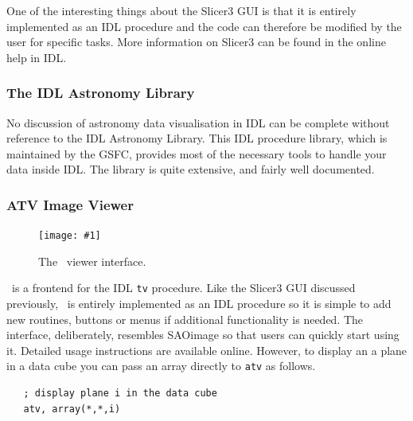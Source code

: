 \documentclass[twoside,11pt]{article}
\newcommand{\htmladdnormallink}[2]{#1}
\newcommand{\htmladdimg}[1]{}
\newcommand{\myfig} [5] {
  \begin{figure}[thb]
    \centering\texttt{[image: \#1]}
    \typeout{#1 inserted on page \arabic{page}}
    \caption{\label{#4}#5}
  \end{figure}
  }
\newcommand{\myfig}[5]{
    \label{#4} \htmladdimg{#3}\\
    Figure: #5\\
    }
\begin{document}
{One of the interesting things about the Slicer3 GUI is that it is
entirely implemented as an IDL \htmladdnormallink{procedure}{
http://www.astro.washington.edu/deutsch-bin/getpro/library07.html?SLICER3}
and the code can therefore be modified by the user for specific tasks.
More information on Slicer3 can be found in the online help in IDL.

\subsubsection{The IDL Astronomy Library}

No discussion of astronomy data visualisation in IDL can be complete
without reference to the \htmladdnormallink{IDL Astronomy
Library}{http://idlastro.gsfc.nasa.gov/}.  This IDL procedure library,
which is maintained by the GSFC, provides most of the necessary tools
to handle your data inside IDL.  The library is quite extensive, and
fairly well
\htmladdnormallink{documented}{http://idlastro.gsfc.nasa.gov/contents.html}.

\subsubsection{ATV Image Viewer}

\myfig{sc16_atv.eps}{height=0.5\textheight}{sc16_atv.gif}{sc16_atv_fig}{The
\ATV\ viewer interface.} 

\htmladdnormallink{\ATV}{http://www.physics.uci.edu/~barth/atv/}
\normalsize\  is a
frontend for the IDL {\tt tv} procedure.  Like the Slicer3 GUI
discussed previously, \ATV\ is entirely implemented as an IDL
\htmladdnormallink{procedure}{http://www.physics.uci.edu/~barth/atv/atv.pro}
so it is simple to add new routines, buttons or menus if additional
functionality is needed.  The interface, deliberately, resembles
SAOimage so that users can quickly start using it.  Detailed usage
\htmladdnormallink{instructions}{http://www.physics.uci.edu/~barth/atv/instructions.html}
are available online.  However,
to display an a plane in a data cube you can pass an array directly to
{\tt atv} as follows.

\small\begin{verbatim}
   ; display plane i in the data cube
   atv, array(*,*,i)
\end{verbatim}\normalsize

}
\end{document}
